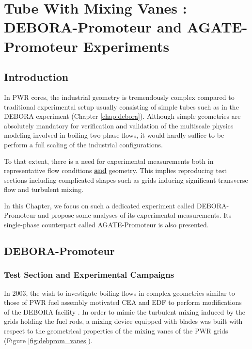 
\chapter{Tube With Mixing Vanes : DEBORA-Promoteur and AGATE-Promoteur Experiments} %

\minitoc

\label{chap:debora_agate_prom} %

\section{Introduction}

In PWR cores, the industrial geometry is tremendously complex compared to traditional experimental setup usually consisting of simple tubes such as in the DEBORA experiment (Chapter \ref{chap:debora}). Although simple geometries are absolutely mandatory for verification and validation of the multiscale physics modeling involved in boiling two-phase flows, it would hardly suffice to be perform a full scaling of the industrial configurations. 

\npar

To that extent, there is a need for experimental measurements both in representative flow conditions \textbf{\underline{and}} geometry. This implies reproducing test sections including complicated shapes such as grids inducing significant transverse flow and turbulent mixing. 

\npar

In this Chapter, we focus on such a dedicated experiment called DEBORA-Promoteur and propose some analyses of its experimental measurements. Its single-phase counterpart called AGATE-Promoteur is also presented.



\section{DEBORA-Promoteur}
\label{sec:deb_prom_desc}

\subsection{Test Section and Experimental Campaigns}

In 2003, the wish to investigate boiling flows in complex geometries similar to those of PWR fuel assembly motivated CEA and EDF to perform modifications of the DEBORA facility \cite{falk_rapport_2002}. In order to mimic the turbulent mixing induced by the grids holding the fuel rods, a mixing device equipped with blades was built with respect to the geometrical properties of the mixing vanes of the PWR grids (Figure \ref{fig:debprom_vanes}).


